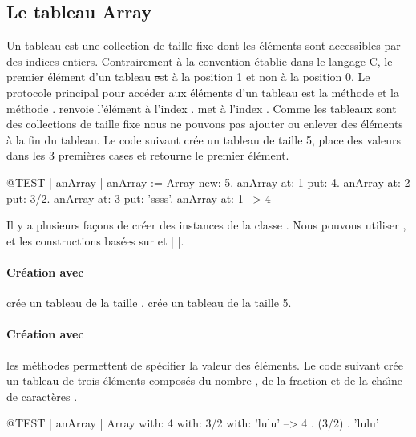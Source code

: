\documentclass[a4paper,10pt,twoside]{book}
\begin{document}
\subsection{Le tableau Array}
Un tableau  est une collection de taille fixe
dont les \'el\'ements sont accessibles par des indices entiers.
Contrairement \`a la convention \'etablie dans le langage C,
le premier \'el\'ement d'un tableau \st est \`a la position 1 et
non \`a la position 0.
Le protocole principal pour acc\'eder aux \'el\'ements d'un tableau
est la m\'ethode
 et la m\'ethode .
  renvoie l'\'el\'ement \`a l'index 
.  met  \`a 
l'index . Comme les tableaux sont des collections de taille
fixe nous ne pouvons pas ajouter ou enlever des \'el\'ements \`a la fin du
tableau.
Le code suivant cr\'ee un tableau de taille 5, place des valeurs dans les 3
premi\`eres cases et retourne le premier \'el\'ement.

\begin{code}{@TEST | anArray | }
anArray := Array new: 5.
anArray at: 1 put: 4.
anArray at: 2 put: 3/2.
anArray at: 3 put: 'ssss'.
anArray at: 1 --> 4
\end{code}

Il y a plusieurs fa\c{c}ons de cr\'eer des instances de la classe 
. Nous pouvons utiliser ,  et les 
constructions bas\'ees sur \ct{#( )} et \ct|{ }|.

\paragraph{Cr\'eation avec }  cr\'ee un tableau de la taille .
 cr\'ee un tableau de la taille 5.

\paragraph{Cr\'eation avec } les m\'ethodes 
 permettent de sp\'ecifier la valeur des \'el\'ements.
Le code suivant cr\'ee un tableau de trois \'el\'ements compos\'es
du nombre
, de la fraction  et de la cha\^{\i}ne de caract\`eres
.

\begin{code}{@TEST | anArray |}
Array with: 4 with: 3/2 with: 'lulu' -->  {4 . (3/2) . 'lulu'}
\end{code}
\end{document}
